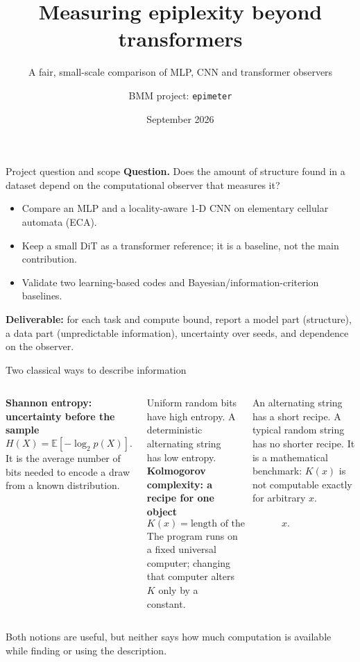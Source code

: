 \documentclass[aspectratio=43]{beamer}
\title{Measuring epiplexity beyond transformers}
\subtitle{A fair, small-scale comparison of MLP, CNN and transformer observers}
\author{BMM project: \texttt{epimeter}}
\date{September 2026}
\newcommand{\E}{\mathbb{E}}
\begin{document}
\begin{frame}
\titlepage
\end{frame}

\begin{frame}{Project question and scope}
\textbf{Question.} Does the amount of structure found in a dataset depend on the
computational observer that measures it?

\medskip
\begin{itemize}
\item Compare an MLP and a locality-aware 1-D CNN on elementary cellular automata (ECA).
\item Keep a small DiT as a transformer reference; it is a baseline, not the main contribution.
\item Validate two learning-based codes and Bayesian/information-criterion baselines.
\end{itemize}

\medskip
\textbf{Deliverable:} for each task and compute bound, report a model part (structure),
a data part (unpredictable information), uncertainty over seeds, and dependence on the observer.
\end{frame}

\begin{frame}{Two classical ways to describe information}
\begin{columns}[T]
\textbf{Shannon entropy: uncertainty before the sample}
\[
H(X)=\E[-\log_2 p(X)].
\]
It is the average number of bits needed to encode a draw from a known distribution.

\medskip
Uniform random bits have high entropy. A deterministic alternating string has low entropy.
\textbf{Kolmogorov complexity: a recipe for one object}
\[
K(x)=\text{length of the shortest program that prints }x.
\]
The program runs on a fixed universal computer; changing that computer alters $K$ only by a constant.

\medskip
An alternating string has a short recipe. A typical random string has no shorter recipe.
It is a mathematical benchmark: $K(x)$ is not computable exactly for arbitrary $x$.
\end{columns}

\medskip
Both notions are useful, but neither says how much computation is available while finding or using the description.
\end{frame}
\end{document}
